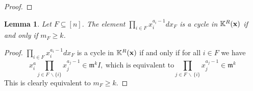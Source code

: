 \documentclass[10pt,reqno]{amsart}
\newtheorem{lemma}[subsection]{Lemma}
\theoremstyle{definition}
\theoremstyle{remark}
\numberwithin{equation}{section}
\newcommand{\m}{\mathfrak m}
\numberwithin{equation}{section}
\begin{document}
\begin{proof}
    
     
\end{proof}

\begin{lemma}\label{deg cond}
  Let $F\subseteq [n]$. The element $\prod_{i\in F} x_i^{a_i-1}dx_F$ is a cycle in $\mathbb K^R({\bf x})$ if and only if $m_F\ge k$.  
\end{lemma}
\begin{proof}
$\prod_{i\in F} x_i^{a_i-1}dx_F$ is a cycle in $\mathbb K^R({\bf x})$ if and only if for all $i\in F$ we have  \[\displaystyle x_i^a\prod_{j\in F\, \backslash \{i\}} x_j^{a_j-1} \in \m^kI,  \ \text{which is equivalent to} \prod_{ j\in F\, \backslash \, \{i\}} x_j^{a_j-1} \in \m^k\] 
This is clearly equivalent to $m_F\ge k$.
\end{proof}
\end{document}
